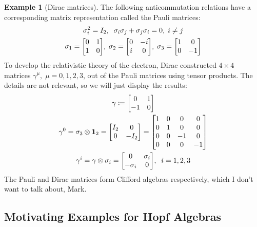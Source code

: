 \documentclass{article}
\theoremstyle{definition}
\newtheorem*{Example*}{Example}
\theoremstyle{remark}
\theoremstyle{underline}
\theoremstyle{underline}
\begin{document}
\begin{Example*}[Dirac matrices]
The following anticommutation relations have a corresponding matrix representation called the Pauli matrices:
\begin{gather*}
	\sigma_i^2 = I_2, \;\; \sigma_i \sigma_j + \sigma_j\sigma_i = 0, \; i \neq j \\
	\sigma_1 = \mqty[0 & 1 \\ 1 & 0],\; \sigma_2 = \mqty[0 & -i \\ i & 0],\; \sigma_3 = \mqty[1 & 0 \\ 0 & -1]
\end{gather*}
To develop the relativistic theory of the electron, Dirac constructed $4 \times 4$ matrices $\gamma^\mu,\; \mu = 0,1,2,3$, out of the Pauli matrices using tensor products. The details are not relevant, so we will just display the results:
\begin{gather*}
	\gamma \coloneqq \mqty[0 & 1 \\ -1 & 0] \\
	\gamma^{0} = \sigma_3 \otimes \mathbf 1_2 = \mqty[I_2 & 0 \\ 0 & -I_2] = \mqty[1 & 0 & 0 & 0 \\ 0 & 1 & 0 & 0 \\ 0 & 0 & -1 & 0 \\ 0 & 0 & 0 & -1] \\
	\gamma^{i} = \gamma \otimes \sigma_i = \mqty[0 & \sigma_i \\ -\sigma_i & 0],\;\; i = 1,2,3
\end{gather*}
The Pauli and Dirac matrices form Clifford algebras respectively, which I don't want to talk about, Mark.
\end{Example*}

\subsection{Motivating Examples for Hopf Algebras}
\end{document}
